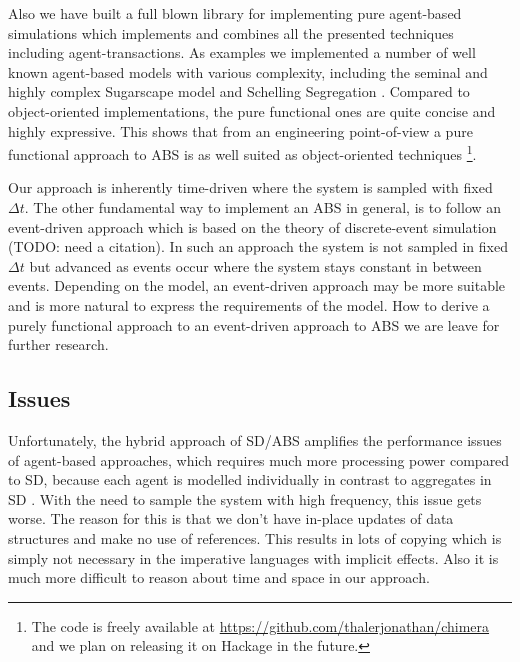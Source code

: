 Also we have built a full blown library for implementing pure agent-based simulations which implements and combines all the presented techniques including agent-transactions. As examples we implemented a number of well known agent-based models with various complexity, including the seminal and highly complex Sugarscape model \cite{epstein_growing_1996} and Schelling Segregation \cite{schelling_dynamic_1971}. Compared to object-oriented implementations, the pure functional ones are quite concise and highly expressive. This shows that from an engineering point-of-view a pure functional approach to ABS is as well suited as object-oriented techniques \footnote{The code is freely available at \url{https://github.com/thalerjonathan/chimera} and we plan on releasing it on Hackage in the future.}.

Our approach is inherently time-driven where the system is sampled with fixed $\Delta t$. The other fundamental way to implement an ABS in general, is to follow an event-driven approach \cite{meyer_event-driven_2014} which is based on the theory of discrete-event simulation (TODO: need a citation). In such an approach the system is not sampled in fixed $\Delta t$ but advanced as events occur where the system stays constant in between events. Depending on the model, an event-driven approach may be more suitable and is more natural to express the requirements of the model. How to derive a purely functional approach to an event-driven approach to ABS we are leave for further research.

\subsection*{Issues}
Unfortunately, the hybrid approach of SD/ABS amplifies the performance issues of agent-based approaches, which requires much more processing power compared to SD, because each agent is modelled individually in contrast to aggregates in SD \cite{macal_agent-based_2010}. With the need to sample the system with high frequency, this issue gets worse. The reason for this is that we don't have in-place updates of data structures and make no use of references. This results in lots of copying which is simply not necessary in the imperative languages with implicit effects. Also it is much more difficult to reason about time and space in our approach. %

